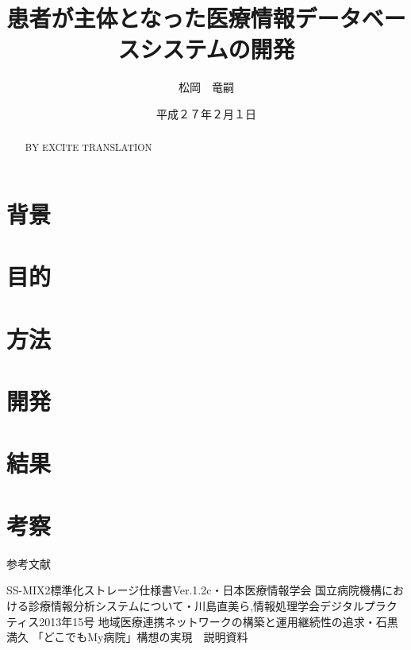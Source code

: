 \documentclass[12pt]{sotsuron}
\title{患者が主体となった医療情報データベースシステムの開発}
\author{松岡　竜嗣}
\date{平成２７年２月１日}
\affiliation{電子機械工学専攻}
\begin{document}
\maketitle
\begin{abstract}

BY EXCITE TRANSLATION
\end{abstract}

\tableofcontents
\clearpage

\section{背景}


\section{目的}


\section{方法}


\section{開発}


\section{結果}


\section{考察}



\appendix

%
参考文献

\begin{thebibliography}{9}
  SS-MIX2標準化ストレージ仕様書Ver.1.2c・日本医療情報学会
   国立病院機構における診療情報分析システムについて・川島直美ら,情報処理学会デジタルプラクティス2013年15号
   地域医療連携ネットワークの構築と運用継続性の追求・石黒満久
   「どこでもMy病院」構想の実現　説明資料
\end{thebibliography}


\clearpage

\listoffigures
\clearpage

\listoftables
\clearpage
\end{document}
